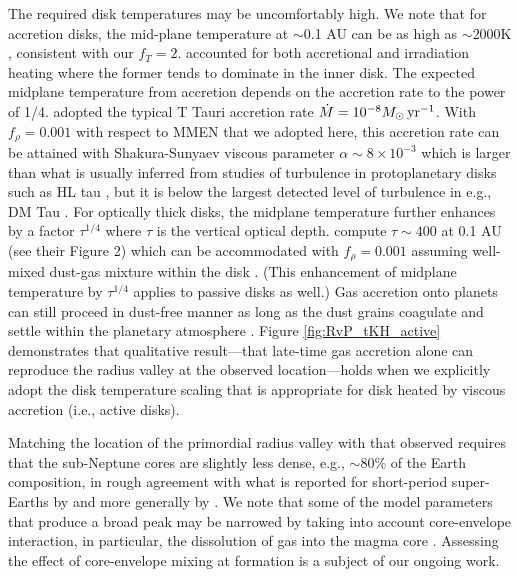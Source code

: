 \documentclass[twocolumn]{aastex63}
\begin{document}
The required disk temperatures may be uncomfortably high. We note that for accretion disks, the mid-plane temperature at $\sim$0.1 AU can be as high as $\sim$2000K \citep[see][their Figure 3]{Dalessio98}, consistent with our $f_T=2$. \citet{Dalessio98} accounted for both accretional and irradiation heating where the former tends to dominate in the inner disk. The expected midplane temperature from accretion depends on the accretion rate to the power of 1/4. \citet{Dalessio98} adopted the typical T Tauri accretion rate $\dot{M} = 10^{-8} M_\odot\,{\rm yr}^{-1}$. With $f_\rho = 0.001$ with respect to MMEN that we adopted here, this accretion rate can be attained with Shakura-Sunyaev viscous parameter $\alpha \sim 8\times 10^{-3}$ which is larger than what is usually inferred from studies of turbulence in protoplanetary disks such as HL tau \citep{Pinte16}, but it is below the largest detected level of turbulence in e.g., DM Tau \citep{Flaherty20}. For optically thick disks, the midplane temperature further enhances by a factor $\tau^{1/4}$ where $\tau$ is the vertical optical depth. \citet{Dalessio98} compute $\tau \sim 400$ at 0.1 AU (see their Figure 2) which can be accommodated with $f_\rho = 0.001$ assuming well-mixed dust-gas mixture within the disk \citep[see][their Figure 1]{Lee18}. (This enhancement of midplane temperature by $\tau^{1/4}$ applies to passive disks as well.) Gas accretion onto planets can still proceed in dust-free manner as long as the dust grains coagulate and settle within the planetary atmosphere \citep[e.g.,][]{Ormel14}. Figure \ref{fig:RvP_tKH_active} demonstrates that qualitative result---that late-time gas accretion alone can reproduce the radius valley at the observed location---holds when we explicitly adopt the disk temperature scaling that is appropriate for disk heated by viscous accretion (i.e., active disks).

Matching the location of the primordial radius valley with that observed requires that the sub-Neptune cores are slightly less dense, e.g., $\sim$80\% of the Earth composition, in rough agreement with what is reported for short-period super-Earths by \citet{Dorn19} and more generally by \citet{Rogers20}. We note that some of the model parameters that produce a broad peak may be narrowed by taking into account core-envelope interaction, in particular, the dissolution of gas into the magma core \citep{Kite19}. Assessing the effect of core-envelope mixing at formation is a subject of our ongoing work.
\end{document}
